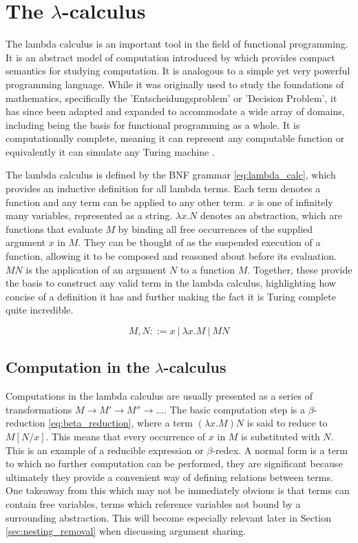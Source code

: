 \documentclass[12pt,a4paper]{report}
\theoremstyle{definition}
\theoremstyle{remark}
\begin{document}
\section{The \texorpdfstring{$\lambda$}{lambda}-calculus}
The lambda calculus is an important tool in the field of functional programming. It is an abstract model of computation introduced by \cite{church_1936} which provides compact semantics for studying computation. It is analogous to a simple yet very powerful programming language. While it was originally used to study the foundations of mathematics, specifically the 'Entscheidungsproblem' or 'Decision Problem', it has since been adapted and expanded to accommodate a wide array of domains, including being the basis for functional programming as a whole. It is computationally complete, meaning it can represent any computable function or equivalently it can simulate any Turing machine \cite{turing_1937}.

The lambda calculus is defined by the BNF grammar \eqref{eq:lambda_calc}, which provides an inductive definition for all lambda terms. Each term denotes a function and any term can be applied to any other term. $x$ is one of infinitely many variables, represented as a string. $\lambda x.N$ denotes an abstraction, which are functions that evaluate $M$ by binding all free occurrences of the supplied argument $x$ in $M$. They can be thought of as the suspended execution of a function, allowing it to be composed and reasoned about before its evaluation. $MN$ is the application of an argument $N$ to a function $M$. Together, these provide the basis to construct any valid term in the lambda calculus, highlighting how concise of a definition it has and further making the fact it is Turing complete quite incredible.

\begin{equation}\label{eq:lambda_calc}
    M,N ::= x\ |\ \lambda x.M\ |\ MN
\end{equation}
\subsection{Computation in the \texorpdfstring{$\lambda$}{lambda}-calculus}

Computations in the lambda calculus are usually presented as a series of transformations $M \rightarrow M' \rightarrow M'' \rightarrow \ldots$. The basic computation step is a $\beta$-reduction \eqref{eq:beta_reduction}, where a term $(\lambda x.M)N$ is said to reduce to $M[N/x]$. This means that every occurrence of $x$ in $M$ is substituted with $N$. This is an example of a reducible expression or $\beta$-redex. A normal form is a term to which no further computation can be performed, they are significant because ultimately they provide a convenient way of defining relations between terms. One takeaway from this which may not be immediately obvious is that terms can contain free variables, terms which reference variables not bound by a surrounding abstraction. This will become especially relevant later in Section \ref{sec:nesting_removal} when discussing argument sharing.
\end{document}

